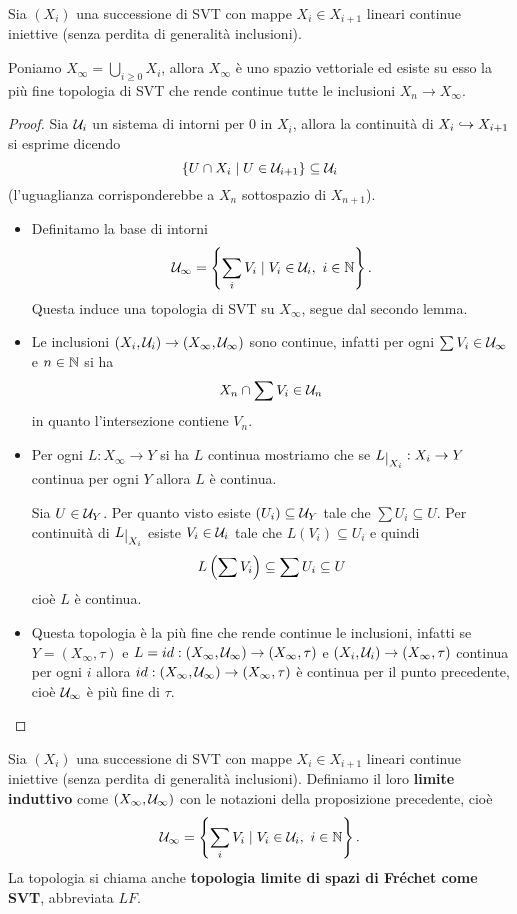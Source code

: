 \begin{proposition}\label{PrLimiteInduttivoDiSVT}
Sia $(X_i)$ una successione di SVT con mappe $X_i\in X_{i+1}$ lineari continue iniettive (senza perdita di generalit\`a inclusioni). 

Poniamo $X_\infty=\bigcup_{i\geq 0}X_i$, allora $X_\infty$ \`e uno spazio vettoriale ed esiste su esso la pi\`u fine topologia di SVT che rende continue tutte le inclusioni $X_n\to X_\infty$.
\end{proposition}
\begin{proof}
Sia $\mathcal{U}_i$ un sistema di intorni per $0$ in $X_i$, allora la continuit\`a di $X_i\hookrightarrow X_{i+1}$ si esprime dicendo
\[\left\{{U\cap X_i\mid U\in \mathcal{U}_{i+1}}\right\}\subseteq \mathcal{U}_{i}\]
(l'uguaglianza corrisponderebbe a $X_n$ sottospazio di $X_{n+1}$).
\begin{itemize}
    \item Definitamo la base di intorni
    \[\Uc_\infty=\cpa{\sum_i V_i\mid V_i\in\Uc_i,\ i\in\N}.\]
    Questa induce una topologia di SVT su $X_\infty$, segue dal secondo lemma.
    \item Le inclusioni $(X_i,\mathcal{U}_i)\to (X_\infty,\mathcal{U}_\infty)$ sono continue, infatti per ogni $\sum V_i\in \mathcal{U}_\infty$ e $n\in\mathbb{N}$ si ha
    \[X_n\cap \sum V_i\in \mathcal{U}_n\]
    in quanto l'intersezione contiene $V_n$.
    \item Per ogni $L:X_\infty\to Y$ si ha $L$ continua mostriamo che se $L\res{X_i}:X_i\to Y$ continua per ogni $Y$ allora $L$ \`e continua.
    
    Sia $U\in \mathcal{U}_Y$. Per quanto visto esiste $(U_i)\subseteq \mathcal{U}_Y$ tale che $\sum U_i\subseteq U$. Per continuit\`a di $L\res{X_i}$ esiste $V_i\in\mathcal{U}_i$ tale che $L(V_i)\subseteq U_i$ e quindi
    \[L\left({\sum V_i}\right)\subseteq \sum U_i\subseteq U\]
    cio\`e $L$ \`e continua.
    \item Questa topologia \`e la pi\`u fine che rende continue le inclusioni, infatti se $Y=(X_\infty,\tau)$ e $L=id:(X_\infty,\mathcal{U}_\infty)\to (X_\infty,\tau)$ e $(X_i,\mathcal{U}_i)\to (X_\infty,\tau)$ continua per ogni $i$ allora $id:(X_\infty,\mathcal{U}_\infty)\to (X_\infty,\tau)$ \`e continua per il punto precedente, cio\`e $\mathcal{U}_\infty$ \`e pi\`u fine di $\tau$.
\end{itemize}
\end{proof}

\begin{definition}
Sia $(X_i)$ una successione di SVT con mappe $X_i\in X_{i+1}$ lineari continue iniettive (senza perdita di generalit\`a inclusioni). Definiamo il loro \textbf{limite induttivo} come $(X_\infty,\mathcal{U}_\infty)$ con le notazioni della proposizione precedente, cio\`e
\[\Uc_\infty=\cpa{\sum_i V_i\mid V_i\in\Uc_i,\ i\in\N}.\]
La topologia si chiama anche \textbf{topologia limite di spazi di Fr\'echet come SVT}, abbreviata $LF$.
\end{definition}

